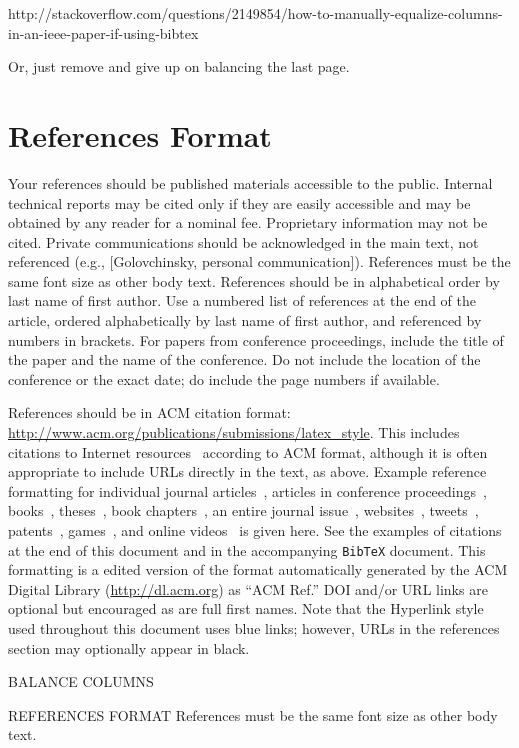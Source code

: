 \documentclass{sigchi}
\begin{document}
 http://stackoverflow.com/questions/2149854/how-to-manually-equalize-columns-
 in-an-ieee-paper-if-using-bibtex

 Or, just remove \balance and give up on balancing the last page.

\balance{}

\section{References Format}
Your references should be published materials accessible to the
public. Internal technical reports may be cited only if they are
easily accessible and may be obtained by any reader for a nominal
fee. Proprietary information may not be cited. Private communications
should be acknowledged in the main text, not referenced (e.g.,
[Golovchinsky, personal communication]). References must be the same
font size as other body text. References should be in alphabetical
order by last name of first author. Use a numbered list of references
at the end of the article, ordered alphabetically by last name of
first author, and referenced by numbers in brackets. For papers from
conference proceedings, include the title of the paper and the name of
the conference. Do not include the location of the conference or the
exact date; do include the page numbers if available. 

References should be in ACM citation format:
\url{http://www.acm.org/publications/submissions/latex_style}.  This
includes citations to Internet
resources~\cite{CHINOSAUR:venue,cavender:writing,psy:gangnam}
according to ACM format, although it is often appropriate to include
URLs directly in the text, as above. Example reference formatting for
individual journal articles~\cite{ethics}, articles in conference
proceedings~\cite{Klemmer:2002:WSC:503376.503378},
books~\cite{Schwartz:1995:GBF}, theses~\cite{sutherland:sketchpad},
book chapters~\cite{winner:politics}, an entire journal
issue~\cite{kaye:puc},
websites~\cite{acm_categories,cavender:writing},
tweets~\cite{CHINOSAUR:venue}, patents~\cite{heilig:sensorama}, 
games~\cite{supermetroid:snes}, and
online videos~\cite{psy:gangnam} is given here.  See the examples of
citations at the end of this document and in the accompanying
\texttt{BibTeX} document. This formatting is a edited version of the
format automatically generated by the ACM Digital Library
(\url{http://dl.acm.org}) as ``ACM Ref.'' DOI and/or URL links are
optional but encouraged as are full first names. Note that the
Hyperlink style used throughout this document uses blue links;
however, URLs in the references section may optionally appear in
black.

 BALANCE COLUMNS
\balance{}

 REFERENCES FORMAT
 References must be the same font size as other body text.


\end{document}
